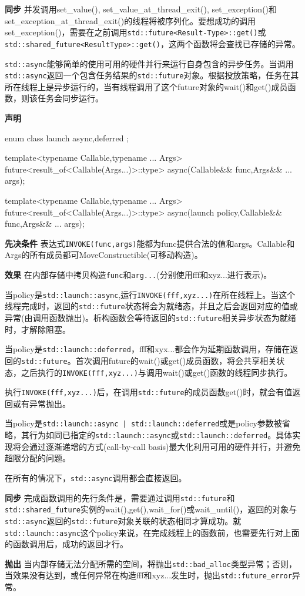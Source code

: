 \textbf{同步}
并发调用set\_value(), set\_value\_at\_thread\_exit(), set\_exception()和set\_exception\_at\_thread\_exit()的线程将被序列化。要想成功的调用set\_exception()，需要在之前调用\texttt{std::future<Result-Type>::get()}或\texttt{std::shared\_future<ResultType>::get()}，这两个函数将会查找已存储的异常。


\texttt{std::async}能够简单的使用可用的硬件并行来运行自身包含的异步任务。当调用\texttt{std::async}返回一个包含任务结果的\texttt{std::future}对象。根据投放策略，任务在其所在线程上是异步运行的，当有线程调用了这个future对象的wait()和get()成员函数，则该任务会同步运行。

\textbf{声明}

\begin{cpp}
enum class launch
{
  async,deferred
};

template<typename Callable,typename ... Args>
future<result_of<Callable(Args...)>::type>
async(Callable&& func,Args&& ... args);

template<typename Callable,typename ... Args>
future<result_of<Callable(Args...)>::type>
async(launch policy,Callable&& func,Args&& ... args);
\end{cpp}

\textbf{先决条件}
表达式\texttt{INVOKE(func,args)}能都为func提供合法的值和args。Callable和Args的所有成员都可MoveConstructible(可移动构造)。

\textbf{效果}
在内部存储中拷贝构造\texttt{func}和\texttt{arg...}(分别使用fff和xyz...进行表示)。

当policy是\texttt{std::launch::async},运行\texttt{INVOKE(fff,xyz...)}在所在线程上。当这个线程完成时，返回的\texttt{std::future}状态将会为就绪态，并且之后会返回对应的值或异常(由调用函数抛出)。析构函数会等待返回的\texttt{std::future}相关异步状态为就绪时，才解除阻塞。

当policy是\texttt{std::launch::deferred}，fff和xyx...都会作为延期函数调用，存储在返回的\texttt{std::future}。首次调用future的wait()或get()成员函数，将会共享相关状态，之后执行的\texttt{INVOKE(fff,xyz...)}与调用wait()或get()函数的线程同步执行。

执行\texttt{INVOKE(fff,xyz...)}后，在调用\texttt{std::future}的成员函数get()时，就会有值返回或有异常抛出。

当policy是\texttt{std::launch::async | std::launch::deferred}或是policy参数被省略，其行为如同已指定的\texttt{std::launch::async}或\texttt{std::launch::deferred}。具体实现将会通过逐渐递增的方式(call-by-call basis)最大化利用可用的硬件并行，并避免超限分配的问题。

在所有的情况下，\texttt{std::async}调用都会直接返回。

\textbf{同步}
完成函数调用的先行条件是，需要通过调用\texttt{std::future}和\texttt{std::shared\_future}实例的wait(),get(),wait\_for()或wait\_until()，返回的对象与\texttt{std::async}返回的\texttt{std::future}对象关联的状态相同才算成功。就\texttt{std::launch::async}这个policy来说，在完成线程上的函数前，也需要先行对上面的函数调用后，成功的返回才行。

\textbf{抛出}
当内部存储无法分配所需的空间，将抛出\texttt{std::bad\_alloc}类型异常；否则，当效果没有达到，或任何异常在构造fff和xyz...发生时，抛出\texttt{std::future\_error}异常。
